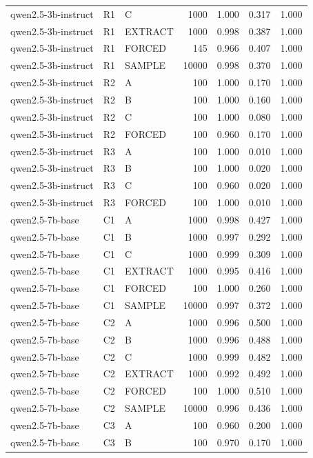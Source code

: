 \begin{table}
\begin{tabular}{lllrrrr}
qwen2.5-3b-instruct & R1 & C & 1000 & 1.000 & 0.317 & 1.000 \\
qwen2.5-3b-instruct & R1 & EXTRACT & 1000 & 0.998 & 0.387 & 1.000 \\
qwen2.5-3b-instruct & R1 & FORCED & 145 & 0.966 & 0.407 & 1.000 \\
qwen2.5-3b-instruct & R1 & SAMPLE & 10000 & 0.998 & 0.370 & 1.000 \\
qwen2.5-3b-instruct & R2 & A & 100 & 1.000 & 0.170 & 1.000 \\
qwen2.5-3b-instruct & R2 & B & 100 & 1.000 & 0.160 & 1.000 \\
qwen2.5-3b-instruct & R2 & C & 100 & 1.000 & 0.080 & 1.000 \\
qwen2.5-3b-instruct & R2 & FORCED & 100 & 0.960 & 0.170 & 1.000 \\
qwen2.5-3b-instruct & R3 & A & 100 & 1.000 & 0.010 & 1.000 \\
qwen2.5-3b-instruct & R3 & B & 100 & 1.000 & 0.020 & 1.000 \\
qwen2.5-3b-instruct & R3 & C & 100 & 0.960 & 0.020 & 1.000 \\
qwen2.5-3b-instruct & R3 & FORCED & 100 & 1.000 & 0.010 & 1.000 \\
qwen2.5-7b-base & C1 & A & 1000 & 0.998 & 0.427 & 1.000 \\
qwen2.5-7b-base & C1 & B & 1000 & 0.997 & 0.292 & 1.000 \\
qwen2.5-7b-base & C1 & C & 1000 & 0.999 & 0.309 & 1.000 \\
qwen2.5-7b-base & C1 & EXTRACT & 1000 & 0.995 & 0.416 & 1.000 \\
qwen2.5-7b-base & C1 & FORCED & 100 & 1.000 & 0.260 & 1.000 \\
qwen2.5-7b-base & C1 & SAMPLE & 10000 & 0.997 & 0.372 & 1.000 \\
qwen2.5-7b-base & C2 & A & 1000 & 0.996 & 0.500 & 1.000 \\
qwen2.5-7b-base & C2 & B & 1000 & 0.996 & 0.488 & 1.000 \\
qwen2.5-7b-base & C2 & C & 1000 & 0.999 & 0.482 & 1.000 \\
qwen2.5-7b-base & C2 & EXTRACT & 1000 & 0.992 & 0.492 & 1.000 \\
qwen2.5-7b-base & C2 & FORCED & 100 & 1.000 & 0.510 & 1.000 \\
qwen2.5-7b-base & C2 & SAMPLE & 10000 & 0.996 & 0.436 & 1.000 \\
qwen2.5-7b-base & C3 & A & 100 & 0.960 & 0.200 & 1.000 \\
qwen2.5-7b-base & C3 & B & 100 & 0.970 & 0.170 & 1.000 \\

\end{tabular}
\end{table}
